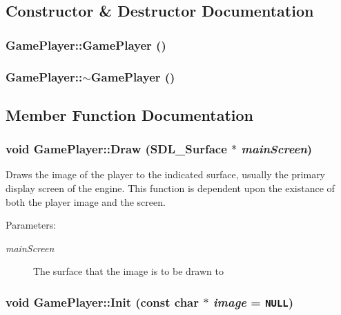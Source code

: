 \subsection{Constructor \& Destructor Documentation}
\hypertarget{class_game_player_f0314668e232831d2f9c263596dccde6}{
\subsubsection[{GamePlayer}]{\setlength{\rightskip}{0pt plus 5cm}GamePlayer::GamePlayer ()}}
\label{d7/df6/class_game_player_f0314668e232831d2f9c263596dccde6}


\hypertarget{class_game_player_ad6c1016873c9e4750ce370552541745}{
\subsubsection[{$\sim$GamePlayer}]{\setlength{\rightskip}{0pt plus 5cm}GamePlayer::$\sim$GamePlayer ()}}
\label{d7/df6/class_game_player_ad6c1016873c9e4750ce370552541745}




\subsection{Member Function Documentation}
\hypertarget{class_game_player_3e5c897e5120b5297e7226a4cb143742}{
\subsubsection[{Draw}]{\setlength{\rightskip}{0pt plus 5cm}void GamePlayer::Draw (SDL\_\-Surface $\ast$ {\em mainScreen})}}
\label{d7/df6/class_game_player_3e5c897e5120b5297e7226a4cb143742}


Draws the image of the player to the indicated surface, usually the primary display screen of the engine. This function is dependent upon the existance of both the player image and the screen.

\begin{Desc}
\item[Parameters:]
\begin{description}
\item[{\em mainScreen}]The surface that the image is to be drawn to \end{description}
\end{Desc}
\hypertarget{class_game_player_937dcf8e5b90200f5ae0a3418adf7271}{
\subsubsection[{Init}]{\setlength{\rightskip}{0pt plus 5cm}void GamePlayer::Init (const char $\ast$ {\em image} = {\tt NULL})}}
\label{d7/df6/class_game_player_937dcf8e5b90200f5ae0a3418adf7271}


